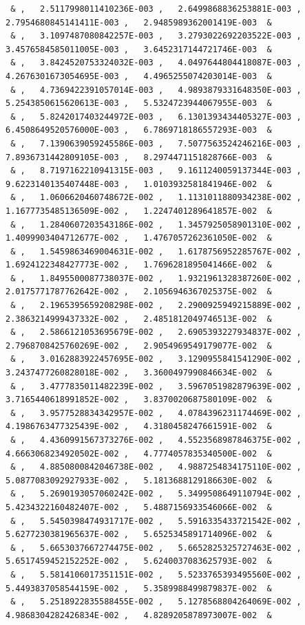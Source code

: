 \documentclass[a4paper,10pt]{report}
\begin{document}
{\begin{verbatim}
 & ,   2.5117998011410236E-003 ,   2.6499868836253881E-003 ,   2.7954680845141411E-003 ,   2.9485989362001419E-003  &
 & ,   3.1097487080842257E-003 ,   3.2793022692203522E-003 ,   3.4576584585011005E-003 ,   3.6452317144721746E-003  &
 & ,   3.8424520753324032E-003 ,   4.0497644804418087E-003 ,   4.2676301673054695E-003 ,   4.4965255074203014E-003  &
 & ,   4.7369422391057014E-003 ,   4.9893879331648350E-003 ,   5.2543850615620613E-003 ,   5.5324723944067955E-003  &
 & ,   5.8242017403244972E-003 ,   6.1301393434405327E-003 ,   6.4508649520576000E-003 ,   6.7869718186557293E-003  &
 & ,   7.1390639059245586E-003 ,   7.5077563524246216E-003 ,   7.8936731442809105E-003 ,   8.2974471151828766E-003  &
 & ,   8.7197162210941315E-003 ,   9.1611240059137344E-003 ,   9.6223140135407448E-003 ,   1.0103932581841946E-002  &
 & ,   1.0606620460748672E-002 ,   1.1131011880934238E-002 ,   1.1677735485136509E-002 ,   1.2247401289641857E-002  &
 & ,   1.2840607203543186E-002 ,   1.3457925058901310E-002 ,   1.4099903404712677E-002 ,   1.4767057262361050E-002  &
 & ,   1.5459863469004631E-002 ,   1.6178756952285767E-002 ,   1.6924122348427773E-002 ,   1.7696281895041466E-002  &
 & ,   1.8495500087738037E-002 ,   1.9321961328387260E-002 ,   2.0175771787762642E-002 ,   2.1056946367025375E-002  &
 & ,   2.1965395659208298E-002 ,   2.2900925949215889E-002 ,   2.3863214999437332E-002 ,   2.4851812049746513E-002  &
 & ,   2.5866121053695679E-002 ,   2.6905393227934837E-002 ,   2.7968708425760269E-002 ,   2.9054969549179077E-002  &
 & ,   3.0162883922457695E-002 ,   3.1290955841541290E-002 ,   3.2437477260828018E-002 ,   3.3600497990846634E-002  &
 & ,   3.4777835011482239E-002 ,   3.5967051982879639E-002 ,   3.7165440618991852E-002 ,   3.8370020687580109E-002  &
 & ,   3.9577528834342957E-002 ,   4.0784396231174469E-002 ,   4.1986763477325439E-002 ,   4.3180458247661591E-002  &
 & ,   4.4360991567373276E-002 ,   4.5523568987846375E-002 ,   4.6663068234920502E-002 ,   4.7774057835340500E-002  &
 & ,   4.8850800842046738E-002 ,   4.9887254834175110E-002 ,   5.0877083092927933E-002 ,   5.1813688129186630E-002  &
 & ,   5.2690193057060242E-002 ,   5.3499508649110794E-002 ,   5.4234322160482407E-002 ,   5.4887156933546066E-002  &
 & ,   5.5450398474931717E-002 ,   5.5916335433721542E-002 ,   5.6277230381965637E-002 ,   5.6525345891714096E-002  &
 & ,   5.6653037667274475E-002 ,   5.6652825325727463E-002 ,   5.6517459452152252E-002 ,   5.6240037083625793E-002  &
 & ,   5.5814106017351151E-002 ,   5.5233765393495560E-002 ,   5.4493837058544159E-002 ,   5.3589988499879837E-002  &
 & ,   5.2518922835588455E-002 ,   5.1278568804264069E-002 ,   4.9868304282426834E-002 ,   4.8289205878973007E-002  &

\end{verbatim}}
\end{document}
